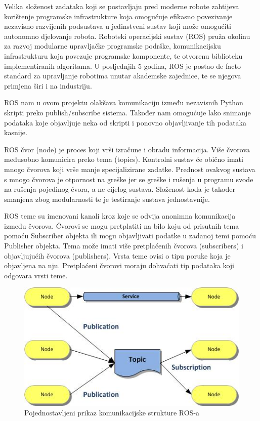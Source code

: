 \documentclass[times, utf8, diplomski]{fer}
\begin{document}
Velika složenost zadataka koji se postavljaju pred moderne robote zahtijeva korištenje programske infrastrukture koja omogućuje efikasno povezivanje nezavisno razvijenih podsustava u jedinstveni sustav koji može omogućiti autonomno djelovanje robota. Robotski operacijski sustav (ROS) pruža okolinu za razvoj modularne upravljačke programske podrške, komunikacijsku infrastrukturu koja povezuje programske komponente, te otvorenu biblioteku implementiranih algoritama. U posljednjih 5 godina, ROS je postao de facto standard za upravljanje robotima unutar akademske zajednice, te se njegova primjena širi i na industriju.

ROS nam u ovom projektu olakšava komunikaciju između nezavisnih Python skripti preko publish/subscribe sistema. Također nam omogućuje lako snimanje podataka koje objavljuje neka od skripti i ponovno objavljivanje tih podataka kasnije.

ROS čvor (node) je proces koji vrši izračune i obradu informacija. Više čvorova međusobno komunicira preko tema (topics). Kontrolni sustav će obično imati mnogo čvorova koji vrše manje specijalizirane zadatke. Prednost ovakvog sustava s mnogo čvorova je otpornost na greške jer se greške i rušenja u programu svode na rušenja pojedinog čvora, a ne cijelog sustava. Složenost koda je također smanjena zbog modularnosti te je testiranje sustava jednostavnije.

ROS teme su imenovani kanali kroz koje se odvija anonimna komunikacija između čvorova. Čvorovi se mogu pretplatiti na bilo koju od prisutnih tema pomoću Subscriber objekta ili mogu objavljivati podatke u zadanoj temi pomoću Publisher objekta. Tema može imati više pretplaćenih čvorova (subscribers) i objavljujućih čvorova (publishers). Vrsta teme ovisi o tipu poruke koja je objavljena na nju. Pretplaćeni čvorovi moraju dohvaćati tip podataka koji odgovara vrsti teme.

\begin{figure}[h]
\centering
\includegraphics[width=.7\textwidth]{ros_struktura}
\caption{Pojednostavljeni prikaz komunikacijske strukture ROS-a \protect\footnotemark}
\label{fig:struktura}
\end{figure}
\end{document}

